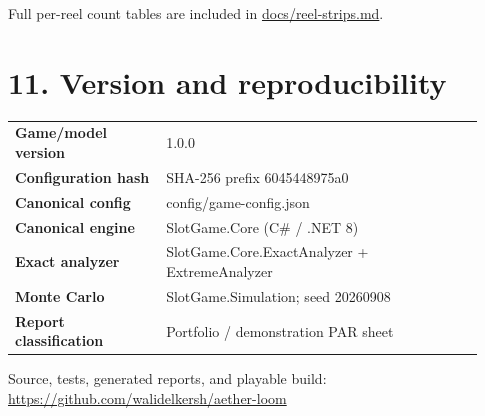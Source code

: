 \documentclass[10pt]{article}
\newcommand{\sectionbar}[1]{\vspace{8pt}{\color{acid}\rule{\linewidth}{1.5pt}}\vspace{-5pt}\section*{#1}}
\begin{document}
Full per-reel count tables are included in \href{https://github.com/walidelkersh/aether-loom/blob/main/docs/reel-strips.md}{docs/reel-strips.md}.

\sectionbar{11. Version and reproducibility}
\begin{tabular}{>{\bfseries}p{0.3\linewidth}p{0.63\linewidth}}
Game/model version & 1.0.0\\
Configuration hash & SHA-256 prefix 6045448975a0\\
Canonical config & config/game-config.json\\
Canonical engine & SlotGame.Core (C\# / .NET 8)\\
Exact analyzer & SlotGame.Core.ExactAnalyzer + ExtremeAnalyzer\\
Monte Carlo & SlotGame.Simulation; seed 20260908\\
Report classification & Portfolio / demonstration PAR sheet\\
\end{tabular}

\vfill\small Source, tests, generated reports, and playable build: \url{https://github.com/walidelkersh/aether-loom}
\end{document}
